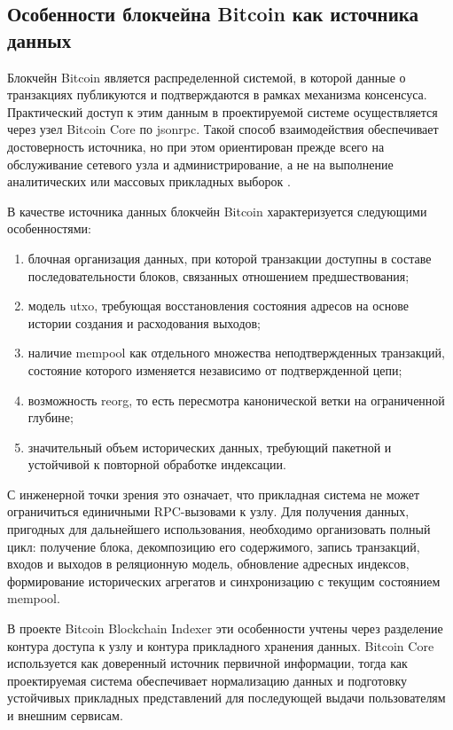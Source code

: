 \subsection{Особенности блокчейна Bitcoin как источника данных}

Блокчейн Bitcoin является распределенной системой, в которой данные о
транзакциях публикуются и подтверждаются в рамках механизма консенсуса.
Практический доступ к этим данным в проектируемой системе осуществляется через
узел Bitcoin Core по \gls{jsonrpc}. Такой способ взаимодействия обеспечивает
достоверность источника, но при этом ориентирован прежде всего на обслуживание
сетевого узла и администрирование, а не на выполнение аналитических или
массовых прикладных выборок \cite{btc_core_rpc}.

В качестве источника данных блокчейн Bitcoin характеризуется следующими
особенностями:
\begin{enumerate}
    \item блочная организация данных, при которой транзакции доступны в составе
    последовательности блоков, связанных отношением предшествования;
    \item модель \gls{utxo}, требующая восстановления состояния адресов на
    основе истории создания и расходования выходов;
    \item наличие mempool как отдельного множества неподтвержденных транзакций,
    состояние которого изменяется независимо от подтвержденной цепи;
    \item возможность reorg, то есть пересмотра канонической ветки на
    ограниченной глубине;
    \item значительный объем исторических данных, требующий пакетной и
    устойчивой к повторной обработке индексации.
\end{enumerate}

С инженерной точки зрения это означает, что прикладная система не может
ограничиться единичными RPC-вызовами к узлу. Для получения данных,
пригодных для дальнейшего использования, необходимо организовать полный цикл:
получение блока, декомпозицию его содержимого, запись транзакций, входов и
выходов в реляционную модель, обновление адресных индексов, формирование
исторических агрегатов и синхронизацию с текущим состоянием mempool.

В проекте Bitcoin Blockchain Indexer эти особенности учтены через
разделение контура доступа к узлу и контура прикладного хранения данных.
Bitcoin Core используется как доверенный источник первичной информации, тогда
как проектируемая система обеспечивает нормализацию данных и подготовку
устойчивых прикладных представлений для последующей выдачи пользователям и
внешним сервисам.
